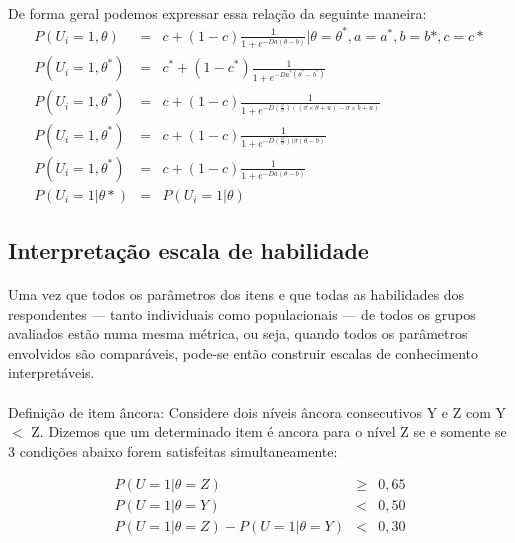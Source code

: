 	\paragraph{}
	    De forma geral podemos expressar essa relação da seguinte maneira:\\
	\begin{eqnarray}
		P(U_{i} = 1,\theta) & = & c + (1-c)\displaystyle\frac{1}{1 + e^{-Da(\theta - b)}} | \theta = \theta^*, a = a^*, b = b*, c = c* \nonumber\\ 
		P(U_{i} = 1,\theta^*) & = & c^* + (1-c^*)\displaystyle\frac{1}{1 + e^{-Da^*(\theta^* - b^*)}} \nonumber\\
		P(U_{i} = 1,\theta^*) & = & c + (1-c)\displaystyle\frac{1}{1 + e^{-D(\frac{a}{\sigma})((\sigma \times \theta + u) - \sigma \times b + u)}}\nonumber\\
		P(U_{i} = 1,\theta^*) & = & c + (1-c)\displaystyle\frac{1}{1 + e^{-D(\frac{a}{\sigma})(\sigma(\theta - b)}} \nonumber\\
		P(U_{i} = 1,\theta^*) & = & c + (1-c)\displaystyle\frac{1}{1 + e^{-Da(\theta - b)}} \nonumber\\
		P(U_i = 1|\theta*) & = & P(U_i = 1|\theta) \nonumber
	\end{eqnarray}
	\subsection{Interpretação escala de habilidade}
	\paragraph{}
	    Uma vez que todos os parâmetros dos itens e que todas as habilidades dos respondentes — tanto individuais como populacionais — de todos os grupos avaliados estão numa mesma métrica, ou seja, quando todos os parâmetros envolvidos são comparáveis, pode-se então construir escalas de conhecimento interpretáveis.
	\paragraph{}
	    Definição de item âncora: Considere dois níveis âncora consecutivos Y e Z com Y $<$ Z. Dizemos que um determinado item é ancora para o nível Z se e somente se 3 condições abaixo forem satisfeitas simultaneamente: 
	
	\begin{eqnarray}
		P(U = 1 | \theta = Z) & \geq & 0,65 \\
		P(U = 1 | \theta = Y) & < & 0,50  \\
		P(U = 1 | \theta = Z) - P(U = 1 | \theta = Y) & < & 0,30
	\end{eqnarray}
